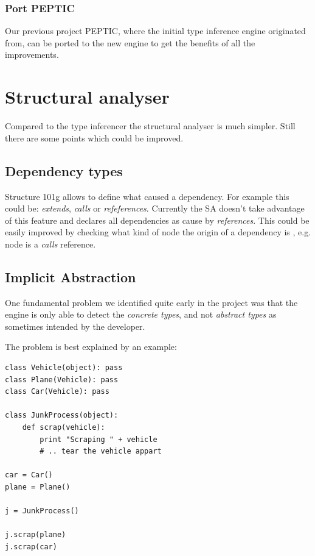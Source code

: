 \documentclass[12pt,halfparskip,DIV11,BCOR10mm]{scrreprt}
\begin{document}
\subsubsection{Port PEPTIC}

Our previous project PEPTIC\cite{peptic2}, where the initial type inference engine originated from, can be ported to the new engine to get the benefits of all the improvements.


\section{Structural analyser}

Compared to the type inferencer the structural analyser is much simpler. Still there are some points which could be improved.

\subsection{Dependency types}

Structure 101g allows to define what caused a dependency. For example this could be: \emph{extends}, \emph{calls} or \emph{refeferences}. Currently the SA doesn't take advantage of this feature and declares all dependencies as cause by \emph{references}. This could be easily improved by checking what kind of node the origin of a dependency is , e.g.  node is a \emph{calls} reference.

\subsection{Implicit Abstraction}

One fundamental problem we identified quite early in the project was that the engine is only able to detect the \emph{concrete types}, and not \emph{abstract types} as sometimes intended by the developer.

The problem is best explained by an example:

\begin{lstlisting}
class Vehicle(object): pass
class Plane(Vehicle): pass
class Car(Vehicle): pass

class JunkProcess(object): 
    def scrap(vehicle):
        print "Scraping " + vehicle
        # .. tear the vehicle appart
        
car = Car()
plane = Plane()

j = JunkProcess()

j.scrap(plane)
j.scrap(car)
\end{lstlisting}
\end{document}
